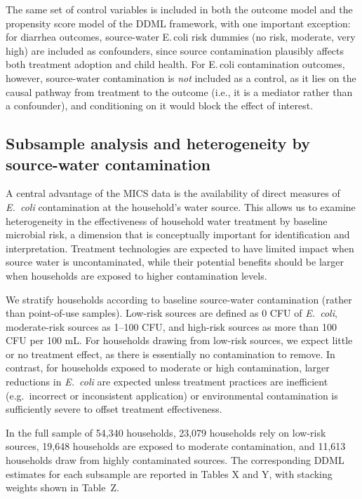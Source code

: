 \documentclass [11pt]{article}
\theoremstyle{plain}
\theoremstyle{definition}
\theoremstyle{remark}
\newcommand{\1}{\bm{1}}
\begin{document}
The same set of control variables is included in both the outcome model and the propensity score model of the DDML framework, with one important exception: for diarrhea outcomes, source-water E.\,coli risk dummies (no risk, moderate, very high) are included as confounders, since source contamination plausibly affects both treatment adoption and child health. For E.\,coli contamination outcomes, however, source-water contamination is \textit{not} included as a control, as it lies on the causal pathway from treatment to the outcome (i.e., it is a mediator rather than a confounder), and conditioning on it would block the effect of interest.


\subsection{Subsample analysis and heterogeneity by source-water contamination}

A central advantage of the MICS data is the availability of direct measures of \emph{E.~coli} contamination at the household’s water source. This allows us to examine heterogeneity in the effectiveness of household water treatment by baseline microbial risk, a dimension that is conceptually important for identification and interpretation. Treatment technologies are expected to have limited impact when source water is uncontaminated, while their potential benefits should be larger when households are exposed to higher contamination levels.

We stratify households according to baseline source-water contamination (rather than point-of-use samples). Low-risk sources are defined as 0 CFU of \emph{E.~coli}, moderate-risk sources as 1–100 CFU, and high-risk sources as more than 100 CFU per 100 mL. For households drawing from low-risk sources, we expect little or no treatment effect, as there is essentially no contamination to remove. In contrast, for households exposed to moderate or high contamination, larger reductions in \emph{E.~coli} are expected unless treatment practices are inefficient (e.g.\ incorrect or inconsistent application) or environmental contamination is sufficiently severe to offset treatment effectiveness.

In the full sample of 54,340 households, 23,079 households rely on low-risk sources, 19,648 households are exposed to moderate contamination, and 11,613 households draw from highly contaminated sources. The corresponding DDML estimates for each subsample are reported in Tables X and Y, with stacking weights shown in Table~Z.
\end{document}

